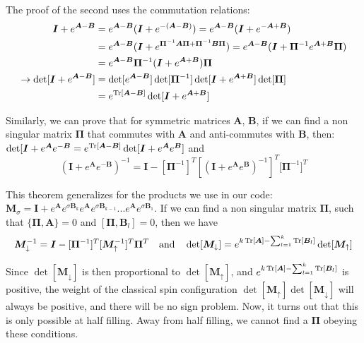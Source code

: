 The proof of the second uses the commutation relations:
\begin{equation}
\begin{split}
\bm I + e^{\bm A - \bm B} &= e^{\bm A - \bm B} ( \bm I + e^{-(\bm A - \bm B)} ) = e^{\bm A - \bm B} ( \bm I + e^{-\bm A + \bm B} ) \\
&=e^{\bm A - \bm B} ( \bm I + e^{\bm \Pi^{-1} \bm A \bm \Pi +\bm \Pi^{-1} \bm B \bm \Pi  } ) = e^{\bm A - \bm B} ( \bm I + \bm \Pi^{-1} e^{\bm A + \bm B} \bm \Pi ) \\
&= e^{\bm A - \bm B}  \bm \Pi^{-1} ( \bm I + e^{\bm A + \bm B} ) \bm \Pi \\
\rightarrow \det [ \bm I + e^{\bm A - \bm B} ]&= \det [ e^{\bm A - \bm B} ] \det [ \bm \Pi^{-1} ] \det [ \bm I + e^{\bm A + \bm B} ] \det [ \bm \Pi ] \\
&= e^{ \operatorname{Tr} [ \bm A - \bm B ] } \det [ \bm I + e^{\bm A + \bm B} ]
\end{split}
\end{equation}

Similarly, we can prove that for symmetric matrices $\bm A$, $\bm B$, if we can find a non singular matrix $\bm \Pi$ that commutes with $\bm A$ and anti-commutes with $\bm B$, then:  $\det[ \bm I + e^{\bm A} e^{-\bm B} = e^{ \operatorname{Tr} [ \bm A - \bm B ] } \det [ \bm I + e^{\bm A} e^{\bm B} ]$ and
\begin{equation}
(\bm I + e^{\bm A} e^{-\bm B} )^{-1} = \bm I - [\bm \Pi^{-1}]^T [ ( \bm I + e^{\bm A} e^{\bm B} )^{-1} ]^T \bm [\bm \Pi^{-1} ]^T
\end{equation}

This theorem generalizes for the products we use in our code: $\bm M_\sigma = \bm I + e^{\bm A} e^{\sigma \bm B_k} e^{\bm A} e^{\sigma \bm B_{k-1}} ... e^{\bm A} e^{\sigma \bm B_1}$.
If we can find a non singular matrix $\bm \Pi$, such that $\{\bm \Pi, \bm A \} = 0$ and $[ \bm \Pi, \bm B_l] = 0$, then we have
\begin{equation}
\bm M_\downarrow^{-1} = \bm I -[ \bm \Pi^{-1}]^T [\bm M_\uparrow^{-1} ]^T \bm \Pi^T \quad \text{and} \quad \det [ \bm M_\downarrow ] = e^{k \operatorname{Tr} [ \bm A ] - \sum_{l = 1}^k \operatorname{Tr} [ \bm B_l] } \det [ \bm M_\uparrow ]
\end{equation}

Since $\det [ \bm M_\downarrow ] $ is then proportional to $\det [ \bm M_\uparrow ]$, and $e^{k \operatorname{Tr} [ \bm A ] - \sum_{l = 1}^k \operatorname{Tr} [ \bm B_l] }$ is positive, the weight of the classical spin configuration $\det [ \bm M_\uparrow ] \det [ \bm M_\downarrow ] $ will always be positive, and there will be no sign problem.
Now, it turns out that this is only possible at half filling.
Away from half filling, we cannot find a $\bm \Pi$ obeying these conditions.


